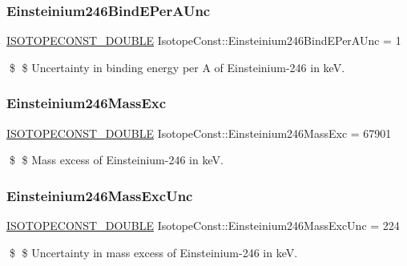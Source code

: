 \subsubsection{\texorpdfstring{Einsteinium246\+Bind\+E\+Per\+A\+Unc}{Einsteinium246BindEPerAUnc}}
{\footnotesize\ttfamily \mbox{\hyperlink{group___isotope_const-_macros_ga8f45a7272ce02c0b4c65c44636ed719a}{I\+S\+O\+T\+O\+P\+E\+C\+O\+N\+S\+T\+\_\+\+D\+O\+U\+B\+LE}} Isotope\+Const\+::\+Einsteinium246\+Bind\+E\+Per\+A\+Unc = 1}

\$ \$ Uncertainty in binding energy per A of Einsteinium-\/246 in keV. \mbox{\label{group___isotope_const-_einsteinium-_es246_ga4dbb861c42a212774eb209f54fd11056}} 
\subsubsection{\texorpdfstring{Einsteinium246\+Mass\+Exc}{Einsteinium246MassExc}}
{\footnotesize\ttfamily \mbox{\hyperlink{group___isotope_const-_macros_ga8f45a7272ce02c0b4c65c44636ed719a}{I\+S\+O\+T\+O\+P\+E\+C\+O\+N\+S\+T\+\_\+\+D\+O\+U\+B\+LE}} Isotope\+Const\+::\+Einsteinium246\+Mass\+Exc = 67901}

\$ \$ Mass excess of Einsteinium-\/246 in keV. \mbox{\label{group___isotope_const-_einsteinium-_es246_ga6172cc974be2f1272fc672d13ce59e42}} 
\subsubsection{\texorpdfstring{Einsteinium246\+Mass\+Exc\+Unc}{Einsteinium246MassExcUnc}}
{\footnotesize\ttfamily \mbox{\hyperlink{group___isotope_const-_macros_ga8f45a7272ce02c0b4c65c44636ed719a}{I\+S\+O\+T\+O\+P\+E\+C\+O\+N\+S\+T\+\_\+\+D\+O\+U\+B\+LE}} Isotope\+Const\+::\+Einsteinium246\+Mass\+Exc\+Unc = 224}

\$ \$ Uncertainty in mass excess of Einsteinium-\/246 in keV. \mbox{\label{group___isotope_const-_einsteinium-_es246_gadc7974df5f9e2d6448c3bad67e4e7c2c}} 
